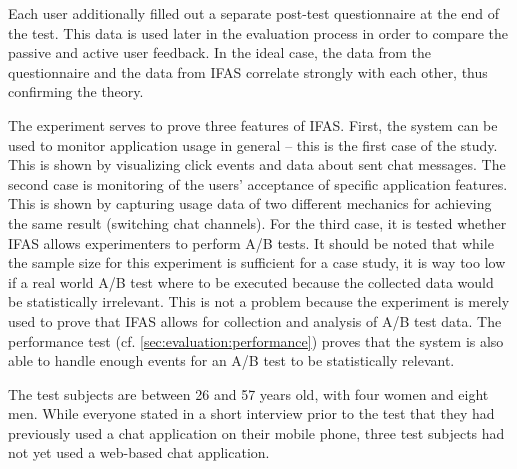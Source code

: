 
Each user additionally filled out a separate post-test questionnaire at the end of the test.
This data is used later in the evaluation process in order to compare the passive and active user feedback.
In the ideal case, the data from the questionnaire and the data from \ac{IFAS} correlate strongly with each other, thus confirming the theory.

The experiment serves to prove three features of \ac{IFAS}.
First, the system can be used to monitor application usage in general -- this is the first case of the study.
This is shown by visualizing click events and data about sent chat messages.
The second case is monitoring of the users' acceptance of specific application features.
This is shown by capturing usage data of two different mechanics for achieving the same result (switching chat channels).
For the third case, it is tested whether \ac{IFAS} allows experimenters to perform A/B tests.
It should be noted that while the sample size for this experiment is sufficient for a case study, it is way too low if a real world A/B test where to be executed because the collected data would be statistically irrelevant.
This is not a problem because the experiment is merely used to prove that \ac{IFAS} allows for collection and analysis of A/B test data.
The performance test (cf. \cref{sec:evaluation:performance}) proves that the system is also able to handle enough events for an A/B test to be statistically relevant.

%

The test subjects are between 26 and 57 years old, with four women and eight men.
While everyone stated in a short interview prior to the test that they had previously used a chat application on their mobile phone, three test subjects had not yet used a web-based chat application.

